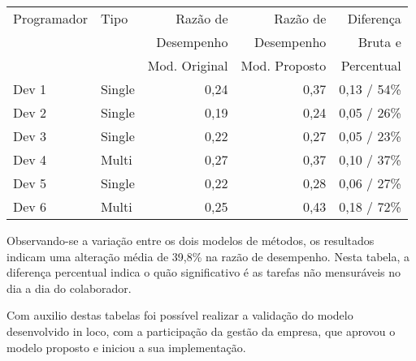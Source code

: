\begin{center}
\begin{tabular}{ | l | l | r | r | r | } 
 \hline
 Programador & Tipo & Razão de & Razão de & Diferença \\ 
 & & Desempenho & Desempenho & Bruta e  \\ 
 & & Mod. Original & Mod. Proposto & Percentual \\ \hline
 Dev 1 & Single & 0,24 & 0,37 & 0,13 / 54\% \\
 Dev 2 & Single & 0,19 & 0,24 & 0,05 / 26\% \\
 Dev 3 & Single & 0,22 & 0,27 & 0,05 / 23\% \\
 Dev 4 & Multi  & 0,27 & 0,37 & 0,10 / 37\% \\
 Dev 5 & Single & 0,22 & 0,28 & 0,06 / 27\% \\
 Dev 6 & Multi  & 0,25 & 0,43 & 0,18 / 72\% \\
 \hline
\end{tabular}
\end{center}

Observando-se a variação entre os dois modelos de métodos, os resultados indicam uma alteração média de 39,8\% na razão de desempenho. Nesta tabela, a diferença percentual indica o quão significativo é as tarefas não mensuráveis no dia a dia do colaborador.\par
Com auxilio destas tabelas foi possível realizar a validação do modelo desenvolvido in loco, com a participação da gestão da empresa, que aprovou o modelo proposto e iniciou a sua implementação.